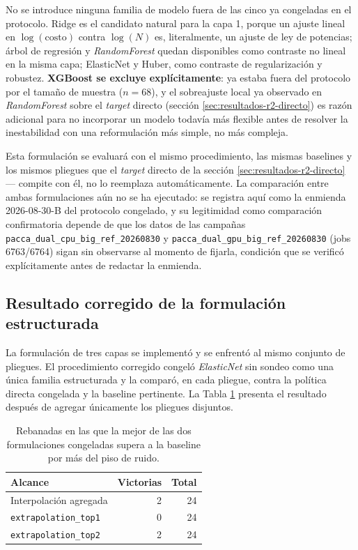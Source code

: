 \documentclass[12pt,oneside,spanish]{book}
\begin{document}
No se introduce ninguna familia de modelo fuera de las cinco ya congeladas en el protocolo. Ridge es el candidato natural para la capa 1, porque un ajuste lineal en $\log(\text{costo})$ contra $\log(N)$ es, literalmente, un ajuste de ley de potencias; árbol de regresión y \textit{RandomForest} quedan disponibles como contraste no lineal en la misma capa; ElasticNet y Huber, como contraste de regularización y robustez. \textbf{XGBoost se excluye explícitamente}: ya estaba fuera del protocolo por el tamaño de muestra ($n=68$), y el sobreajuste local ya observado en \textit{RandomForest} sobre el \textit{target} directo (sección \ref{sec:resultados-r2-directo}) es razón adicional para no incorporar un modelo todavía más flexible antes de resolver la inestabilidad con una reformulación más simple, no más compleja.

Esta formulación se evaluará con el mismo procedimiento, las mismas baselines y los mismos pliegues que el \textit{target} directo de la sección \ref{sec:resultados-r2-directo} --- compite con él, no lo reemplaza automáticamente. La comparación entre ambas formulaciones aún no se ha ejecutado: se registra aquí como la enmienda 2026-08-30-B del protocolo congelado, y su legitimidad como comparación confirmatoria depende de que los datos de las campañas \texttt{pacca\_dual\_cpu\_big\_ref\_20260830} y \texttt{pacca\_dual\_gpu\_big\_ref\_20260830} (jobs 6763/6764) sigan sin observarse al momento de fijarla, condición que se verificó explícitamente antes de redactar la enmienda.
\fi

\subsection{Resultado corregido de la formulación estructurada}
\label{sec:resultados-r2-estructurada}

La formulación de tres capas se implementó y se enfrentó al mismo conjunto de pliegues. El procedimiento corregido congeló \textit{ElasticNet} sin sondeo como una única familia estructurada y la comparó, en cada pliegue, contra la política directa congelada y la baseline pertinente. La Tabla \ref{tab:r2-estructurado-corregido} presenta el resultado después de agregar únicamente los pliegues disjuntos.

\begin{table}[H]
\centering
\caption[Resultado corregido de la comparación de tres vías]{Rebanadas en las que la mejor de las dos formulaciones congeladas supera a la baseline por más del piso de ruido.}
\label{tab:r2-estructurado-corregido}
\begin{tabular}{lrr}
\toprule
\textbf{Alcance} & \textbf{Victorias} & \textbf{Total} \\
\midrule
Interpolación agregada       & 2 & 24 \\
\texttt{extrapolation\_top1} & 0 & 24 \\
\texttt{extrapolation\_top2} & 2 & 24 \\
\bottomrule
\end{tabular}
\end{table}
\end{document}
